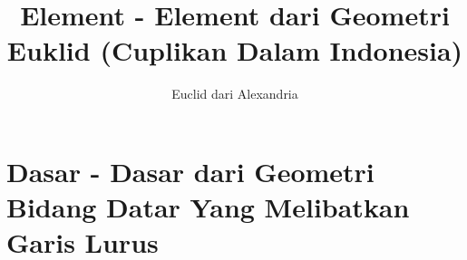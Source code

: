 \documentclass[a4paper]{book}
\begin{document}
\title{\textbf{Element - Element dari Geometri Euklid 
(Cuplikan Dalam Indonesia)}}
\author{Euclid dari Alexandria}
\maketitle
\tableofcontents
\newcommand\chap[1]{%
\chapter*{#1}%
  \addcontentsline{toc}{chapter}{section}{#1}}
\pagestyle{empty}
\setcounter{chapter}{1}
\chapter*{\centering \chaptername{ \thechapter} 
Dasar - Dasar dari Geometri Bidang Datar Yang Melibatkan Garis Lurus}
\end{document}
